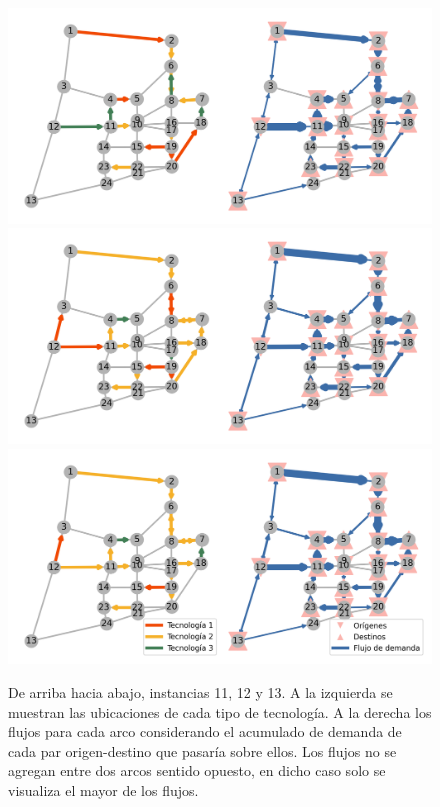 \begin{figure}[h!]
  \centering
  \includegraphics[width=0.85\linewidth]{../resources/sioux_falls_0.4_budget_factor_linear_5_breakpoints.png}
  \includegraphics[width=0.85\linewidth]{../resources/sioux_falls_0.4_budget_factor_linear_20_breakpoints.png}
  \includegraphics[width=0.85\linewidth]{../resources/sioux_falls_0.4_budget_factor_linear_50_breakpoints.png}
  \caption{De arriba hacia abajo, instancias 11, 12 y 13. A la izquierda se muestran las ubicaciones de cada tipo de tecnología. A la derecha los flujos para cada arco considerando el acumulado de demanda de cada par origen-destino que pasaría sobre ellos. Los flujos no se agregan entre dos arcos sentido opuesto, en dicho caso solo se visualiza el mayor de los flujos.}
  \label{fig:sensibilityinstance11_12_13}
\end{figure}

